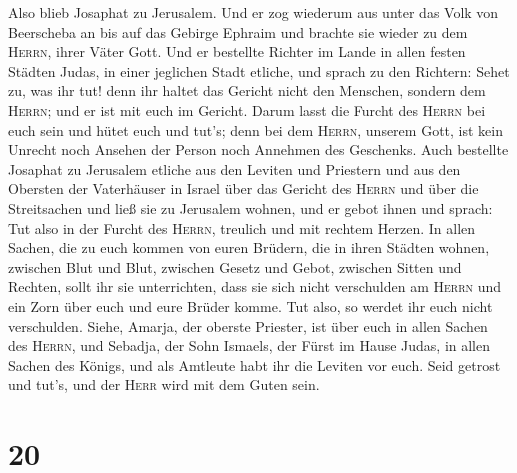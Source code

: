  Also blieb Josaphat zu Jerusalem. Und er zog wiederum aus
unter das Volk von Beerscheba an bis auf das Gebirge Ephraim und brachte
sie wieder zu dem \textsc{Herrn}, ihrer Väter Gott.  Und
er bestellte Richter im Lande in allen festen Städten Judas, in einer
jeglichen Stadt etliche,  und sprach zu den Richtern:
Sehet zu, was ihr tut! denn ihr haltet das Gericht nicht den Menschen,
sondern dem \textsc{Herrn}; und er ist mit euch im Gericht.
 Darum lasst die Furcht des \textsc{Herrn} bei euch sein
und hütet euch und tut's; denn bei dem \textsc{Herrn}, unserem Gott, ist
kein Unrecht noch Ansehen der Person noch Annehmen des Geschenks.
 Auch bestellte Josaphat zu Jerusalem etliche aus den
Leviten und Priestern und aus den Obersten der Vaterhäuser in Israel
über das Gericht des \textsc{Herrn} und über die Streitsachen und ließ
sie zu Jerusalem wohnen,  und er gebot ihnen und sprach:
Tut also in der Furcht des \textsc{Herrn}, treulich und mit rechtem
Herzen.  In allen Sachen, die zu euch kommen von euren
Brüdern, die in ihren Städten wohnen, zwischen Blut und Blut, zwischen
Gesetz und Gebot, zwischen Sitten und Rechten, sollt ihr sie
unterrichten, dass sie sich nicht verschulden am \textsc{Herrn} und ein
Zorn über euch und eure Brüder komme. Tut also, so werdet ihr euch nicht
verschulden.  Siehe, Amarja, der oberste Priester, ist
über euch in allen Sachen des \textsc{Herrn}, und Sebadja, der Sohn
Ismaels, der Fürst im Hause Judas, in allen Sachen des Königs, und als
Amtleute habt ihr die Leviten vor euch. Seid getrost und tut's, und der
\textsc{Herr} wird mit dem Guten sein.

\hypertarget{section-19}{%
\section{20}\label{section-19}}

